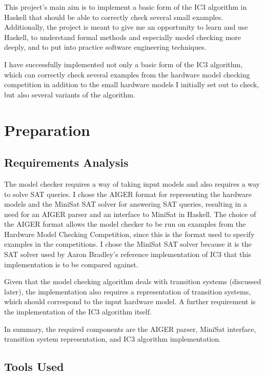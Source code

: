 \documentclass[12pt,a4paper,twoside,openright]{report}
\begin{document}
This project's main aim is to implement a basic form of the IC3 algorithm in
Haskell that should be able to correctly check several
small examples. Additionally, the project is meant to give me an opportunity
to learn and use Haskell, to understand formal methods and especially model
checking more deeply, and to put into practice software engineering techniques.

I have successfully implemented not only a basic form of the IC3 algorithm,
which can correctly check several examples from the hardware model checking
competition in addition to the small hardware models I initially set out
to check, but also several variants of the algorithm.

\chapter{Preparation}

\section{Requirements Analysis}


The model checker requires a way of taking input models and also
requires a way to solve SAT queries.
I chose the AIGER format for representing the hardware models and the
MiniSat SAT solver for answering SAT queries, resulting in a need for an
AIGER parser and an interface to MiniSat in Haskell. The choice of
the AIGER format allows the model checker to be run on examples from
the Hardware Model Checking Competition, since this is the format used
to specify examples in the competitions. I chose the MiniSat SAT
solver because it is the SAT solver used by Aaron Bradley's reference
implementation of IC3 that this implementation is to be compared against.

Given that the model checking algorithm deals with transition systems
(discussed later), the implementation also requires a representation of
transition systems, which should correspond to the input hardware model.
A further requirement is the implementation of the
IC3 algorithm itself.

In summary, the required components are the AIGER parser, MiniSat interface,
transition system representation, and IC3 algorithm implementation.

\section{Tools Used}
\end{document}
